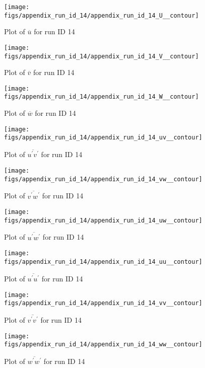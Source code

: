 \begin{figure}[H]
\centering
\texttt{[image: figs/appendix\_run\_id\_14/appendix\_run\_id\_14\_U\_\_contour]}
\caption{Plot of $\overline{u}$ for run ID 14}
\label{fig:appendix_run_id_14_U__contour}
\end{figure}


\begin{figure}[H]
\centering
\texttt{[image: figs/appendix\_run\_id\_14/appendix\_run\_id\_14\_V\_\_contour]}
\caption{Plot of $\overline{v}$ for run ID 14}
\label{fig:appendix_run_id_14_V__contour}
\end{figure}


\begin{figure}[H]
\centering
\texttt{[image: figs/appendix\_run\_id\_14/appendix\_run\_id\_14\_W\_\_contour]}
\caption{Plot of $\overline{w}$ for run ID 14}
\label{fig:appendix_run_id_14_W__contour}
\end{figure}


\begin{figure}[H]
\centering
\texttt{[image: figs/appendix\_run\_id\_14/appendix\_run\_id\_14\_uv\_\_contour]}
\caption{Plot of $\overline{u^\prime v^\prime}$ for run ID 14}
\label{fig:appendix_run_id_14_uv__contour}
\end{figure}


\begin{figure}[H]
\centering
\texttt{[image: figs/appendix\_run\_id\_14/appendix\_run\_id\_14\_vw\_\_contour]}
\caption{Plot of $\overline{v^\prime w^\prime}$ for run ID 14}
\label{fig:appendix_run_id_14_vw__contour}
\end{figure}


\begin{figure}[H]
\centering
\texttt{[image: figs/appendix\_run\_id\_14/appendix\_run\_id\_14\_uw\_\_contour]}
\caption{Plot of $\overline{u^\prime w^\prime}$ for run ID 14}
\label{fig:appendix_run_id_14_uw__contour}
\end{figure}


\begin{figure}[H]
\centering
\texttt{[image: figs/appendix\_run\_id\_14/appendix\_run\_id\_14\_uu\_\_contour]}
\caption{Plot of $\overline{u^\prime u^\prime}$ for run ID 14}
\label{fig:appendix_run_id_14_uu__contour}
\end{figure}


\begin{figure}[H]
\centering
\texttt{[image: figs/appendix\_run\_id\_14/appendix\_run\_id\_14\_vv\_\_contour]}
\caption{Plot of $\overline{v^\prime v^\prime}$ for run ID 14}
\label{fig:appendix_run_id_14_vv__contour}
\end{figure}


\begin{figure}[H]
\centering
\texttt{[image: figs/appendix\_run\_id\_14/appendix\_run\_id\_14\_ww\_\_contour]}
\caption{Plot of $\overline{w^\prime w^\prime}$ for run ID 14}
\label{fig:appendix_run_id_14_ww__contour}
\end{figure}


